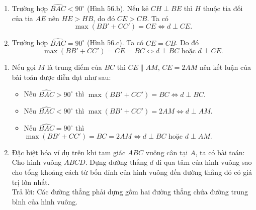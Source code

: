 \begin{vd}
{\begin{enumerate}
			\item Trường hợp $\widehat{BAC} < 90^{\circ}$ (Hình 56.b). Nếu kẻ $CH \perp BE$ thì $H$ thuộc tia đối của tia $AE$ nên $HE>HB$, do đó $CE>CB$. Ta có $$\max \left(BB'+CC'\right)=CE \Leftrightarrow d \perp CE.$$
			\item Trường hợp $\widehat{BAC} = 90^{\circ}$ (Hình 56.c). Ta có $CE=CB$. Do đó $$\max \left(BB'+CC'\right)=CE=BC \Leftrightarrow d \perp BC \text{ hoặc } d \perp CE.$$
		\end{enumerate}
	}
\end{vd}
\begin{note}
	\begin{enumerate}
		\item Nếu gọi $M$ là trung điểm của $BC$ thì $CE \parallel AM$, $CE=2AM$ nên kết luận của bài toán được diễn đạt như sau:
		\begin{itemize}
			\item Nếu $\widehat{BAC} > 90^{\circ}$ thì $\max \left(BB'+CC'\right)=BC \Leftrightarrow d \perp BC.$
			\item Nếu $\widehat{BAC} < 90^{\circ}$ thì $\max \left(BB'+CC'\right)=2AM \Leftrightarrow d \perp AM.$
			\item Nếu $\widehat{BAC} = 90^{\circ}$ thì $\max \left(BB'+CC'\right)=BC =2AM \Leftrightarrow d \perp BC \text{ hoặc } d \perp AM.$
		\end{itemize}
		\item Đặc biệt hóa ví dụ trên khi tam giác $ABC$ vuông cân tại $A$, ta có bài toán: Cho hình vuông $ABCD$. Dựng đường thẳng $d$ đi qua tâm của hình vuông sao cho tổng khoảng cách từ bốn đỉnh của hình vuông đến đường thẳng đó có giá trị lớn nhất.\\
		Trả lời: Các đường thẳng phải dựng gồm hai đường thẳng chứa đường trung bình của hình vuông.
	\end{enumerate}
\end{note}
